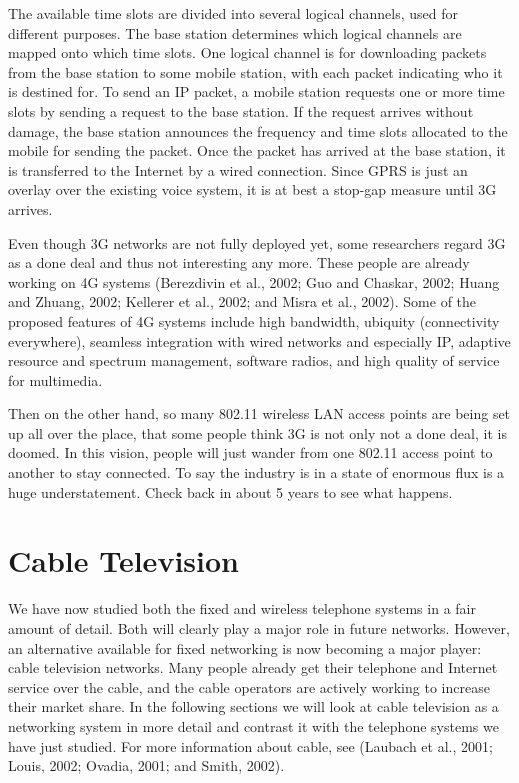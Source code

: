 The available time slots are divided into several logical channels, used
for different purposes. The base station determines which logical
channels are mapped onto which time slots. One logical channel is for
downloading packets from the base station to some mobile station, with
each packet indicating who it is destined for. To send an IP packet, a
mobile station requests one or more time slots by sending a request to
the base station. If the request arrives without damage, the base
station announces the frequency and time slots allocated to the mobile
for sending the packet. Once the packet has arrived at the base station,
it is transferred to the Internet by a wired connection. Since GPRS is
just an overlay over the existing voice system, it is at best a stop-gap
measure until 3G arrives.

Even though 3G networks are not fully deployed yet, some researchers
regard 3G as a done deal and thus not interesting any more. These people
are already working on 4G systems (Berezdivin et al., 2002; Guo and
Chaskar, 2002; Huang and Zhuang, 2002; Kellerer et al., 2002; and Misra
et al., 2002). Some of the proposed features of 4G systems include high
bandwidth, ubiquity (connectivity everywhere), seamless integration with
wired networks and especially IP, adaptive resource and spectrum
management, software radios, and high quality of service for multimedia.

Then on the other hand, so many 802.11 wireless LAN access points are
being set up all over the place, that some people think 3G is not only
not a done deal, it is doomed. In this vision, people will just wander
from one 802.11 access point to another to stay connected. To say the
industry is in a state of enormous flux is a huge understatement. Check
back in about 5 years to see what happens.


\section{Cable Television}

We have now studied both the fixed and wireless telephone systems in a
fair amount of detail. Both will clearly play a major role in future
networks. However, an alternative available for fixed networking is now
becoming a major player: cable television networks. Many people already
get their telephone and Internet service over the cable, and the cable
operators are actively working to increase their market share. In the
following sections we will look at cable television as a networking
system in more detail and contrast it with the telephone systems we have
just studied. For more information about cable, see (Laubach et al.,
2001; Louis, 2002; Ovadia, 2001; and Smith, 2002).

